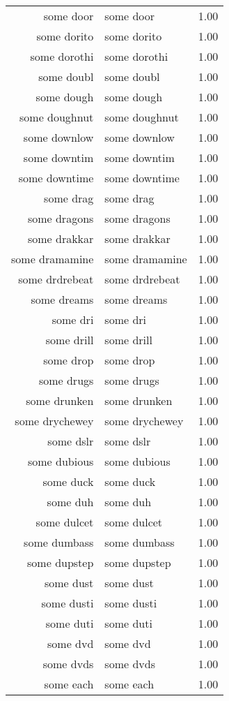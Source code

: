 \begin{table}[ht]
\begin{tabular}{rlr}
  some door & some door & 1.00 \\ 
  some dorito & some dorito & 1.00 \\ 
  some dorothi & some dorothi & 1.00 \\ 
  some doubl & some doubl & 1.00 \\ 
  some dough & some dough & 1.00 \\ 
  some doughnut & some doughnut & 1.00 \\ 
  some downlow & some downlow & 1.00 \\ 
  some downtim & some downtim & 1.00 \\ 
  some downtime & some downtime & 1.00 \\ 
  some drag & some drag & 1.00 \\ 
  some dragons & some dragons & 1.00 \\ 
  some drakkar & some drakkar & 1.00 \\ 
  some dramamine & some dramamine & 1.00 \\ 
  some drdrebeat & some drdrebeat & 1.00 \\ 
  some dreams & some dreams & 1.00 \\ 
  some dri & some dri & 1.00 \\ 
  some drill & some drill & 1.00 \\ 
  some drop & some drop & 1.00 \\ 
  some drugs & some drugs & 1.00 \\ 
  some drunken & some drunken & 1.00 \\ 
  some drychewey & some drychewey & 1.00 \\ 
  some dslr & some dslr & 1.00 \\ 
  some dubious & some dubious & 1.00 \\ 
  some duck & some duck & 1.00 \\ 
  some duh & some duh & 1.00 \\ 
  some dulcet & some dulcet & 1.00 \\ 
  some dumbass & some dumbass & 1.00 \\ 
  some dupstep & some dupstep & 1.00 \\ 
  some dust & some dust & 1.00 \\ 
  some dusti & some dusti & 1.00 \\ 
  some duti & some duti & 1.00 \\ 
  some dvd & some dvd & 1.00 \\ 
  some dvds & some dvds & 1.00 \\ 
  some each & some each & 1.00 \\ 

\end{tabular}
\end{table}
